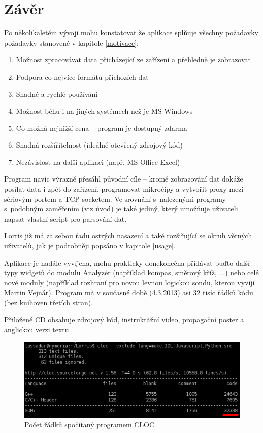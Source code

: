 \documentclass[12pt, a4paper, oneside]{article}
\newcommand{\Has}{\textcolor{green}{\CheckmarkBold}}
\begin{document}
\newpage
\section*{Závěr}
Po několikaletém vývoji mohu konstatovat že aplikace splňuje všechny požadavky požadavky stanovené v kapitole \ref{motivace}:
\begin{enumerate}[label=\Has\hspace{1.5mm}\arabic{*}.] 
    \item Možnost zpracovávat data přicházející ze zařízení a přehledně je zobrazovat%
    \item Podpora co nejvíce formátů příchozích dat%
    \item Snadné a rychlé používání %
    \item Možnost běhu i na jiných systémech než je MS Windows %
    \item Co možná nejnižší cena -- program je dostupný zdarma%
    \item Snadná rozšířitelnost (ideálně otevřený zdrojový kód) %
    \item Nezávislost na další aplikaci (např. MS Office Excel) %
\end{enumerate}
Program navíc výrazně přesáhl původní cíle -- kromě zobrazování dat dokáže posílat data i zpět do zařízení, programovat mikročipy a vytvořit proxy mezi sériovým portem a TCP socketem. Ve srovnání s~nalezenými programy s~podobným zaměřením (viz úvod) je také jediný, který umožňuje uživateli napsat vlastní script pro parsování dat.

Lorris již má za sebou řadu ostrých nasazení a také rozšiřující se okruh věrných uživatelů, jak je podrobněji popsáno v kapitole \ref{usage}.

Aplikace je nadále vyvíjena, mohu prakticky donekonečna přídávat buďto další typy widgetů do modulu Analyzér (například kompas, směrový kříž, ...) nebo celé nové moduly (například rozhraní pro novou levnou logickou sondu, kterou vyvíjí Martin Vejnár). Program má v současné době (4.3.2013) asi 32 tisíc řádků kódu (bez knihoven třetích stran).

Přiložené CD obsahuje zdrojový kód, instruktážní video, propagační poster a anglickou verzi textu.
\begin{figure}[H]
\begin{center}
\includegraphics[width=\textwidth]{img/cloc_edit.png}
\caption{Počet řádků spočítaný programem CLOC\cite{cloc}}
\end{center}
\end{figure}
\end{document}
